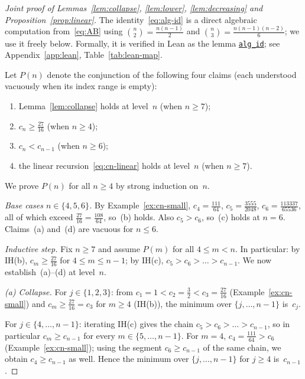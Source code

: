 \documentclass[12pt]{article}
\theoremstyle{definition}
\theoremstyle{remark}
\begin{document}
\begin{proof}[Joint proof of Lemmas~\ref{lem:collapse},
  \ref{lem:lower}, \ref{lem:decreasing} and Proposition~\ref{prop:linear}]
  The identity~\eqref{eq:alg-id} is a direct algebraic computation
  from~\eqref{eq:AB} using $\binom{n}{2}=\tfrac{n(n-1)}{2}$ and
  $\binom{n}{3}=\tfrac{n(n-1)(n-2)}{6}$; we use it freely below.
  Formally, it is verified in Lean as the lemma
  \href{https://github.com/pfaffelh/coins/blob/c60bcd3/CoinsLean/CoinsLean/Perturbation.lean\#L932}{\texttt{alg\_id}};
  see Appendix~\ref{app:lean}, Table~\ref{tab:lean-map}.

  Let $P(n)$ denote the conjunction of the following
  four claims (each understood vacuously when its index range is
  empty):
  \begin{enumerate}[\rm(a)]
  \item Lemma~\ref{lem:collapse} holds at level~$n$ (when $n\ge 7$);
  \item $c_n\ge\tfrac{27}{16}$ (when $n\ge 4$);
  \item $c_n<c_{n-1}$ (when $n\ge 6$);
  \item the linear recursion~\eqref{eq:cn-linear} holds at level~$n$
    (when $n\ge 7$).
  \end{enumerate}
  We prove $P(n)$ for all $n\ge 4$ by strong induction on~$n$.

  \medskip
  \emph{Base cases $n\in\{4,5,6\}$.}  By Example~\ref{ex:cn-small},
  $c_4=\tfrac{111}{64}$, $c_5=\tfrac{3555}{2048}$,
  $c_6=\tfrac{113337}{65536}$, all of which exceed
  $\tfrac{27}{16}=\tfrac{108}{64}$, so~(b) holds.  Also $c_5>c_6$,
  so~(c) holds at $n=6$.  Claims~(a) and~(d) are vacuous for
  $n\le 6$.

  \medskip
  \emph{Inductive step.}  Fix $n\ge 7$ and assume $P(m)$ for all
  $4\le m<n$.  In particular: by IH(b),
  $c_m\ge\tfrac{27}{16}$ for $4\le m\le n-1$; by IH(c),
  $c_5>c_6>\dots>c_{n-1}$.  We now establish~(a)--(d) at level~$n$.

  \emph{(a) Collapse.}  For $j\in\{1,2,3\}$: from
  $c_1=1<c_2=\tfrac32<c_3=\tfrac{27}{16}$ (Example~\ref{ex:cn-small})
  and $c_m\ge\tfrac{27}{16}=c_3$ for $m\ge 4$ (IH(b)), the minimum
  over $\{j,\dots,n-1\}$ is~$c_j$.

  For $j\in\{4,\dots,n-1\}$: iterating IH(c) gives the chain
  $c_5>c_6>\dots>c_{n-1}$, so in particular
  $c_m\ge c_{n-1}$ for every $m\in\{5,\dots,n-1\}$.  For $m=4$,
  $c_4=\tfrac{111}{64}>c_6$ (Example~\ref{ex:cn-small}); using the
  segment $c_6\ge c_{n-1}$ of the same chain, we obtain $c_4\ge
  c_{n-1}$ as well.  Hence the minimum over $\{j,\dots,n-1\}$ for
  $j\ge 4$ is~$c_{n-1}$.


\end{proof}
\end{document}
